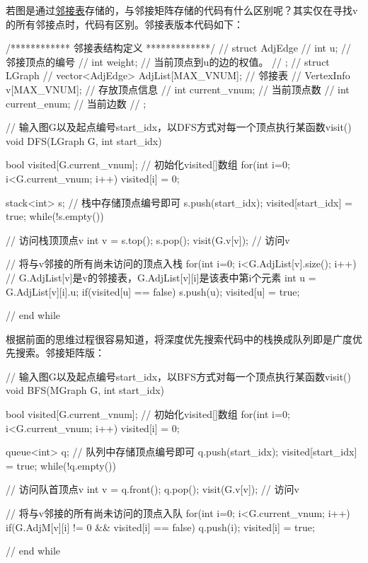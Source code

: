 若图是通过\uline{邻接表}存储的，与邻接矩阵存储的代码有什么区别呢？其实仅在寻找v的所有邻接点时，代码有区别。邻接表版本代码如下：
\begin{cppcodeHighlight}[14,31-37]
/************ 邻接表结构定义 *************/
// struct AdjEdge {
//     int u;  // 邻接顶点的编号
//     int weight; // 当前顶点到u的边的权值。
// };
// struct LGraph {
//     vector<AdjEdge> AdjList[MAX_VNUM];  // 邻接表
//     VertexInfo v[MAX_VNUM];     // 存放顶点信息
//     int current_vnum;           // 当前顶点数
//     int current_enum;           // 当前边数
// };

// 输入图G以及起点编号start_idx，以DFS方式对每一个顶点执行某函数visit()
    void DFS(LGraph G, int start_idx) {
        bool visited[G.current_vnum];
        // 初始化visited[]数组
        for(int i=0; i<G.current_vnum; i++) {
            visited[i] = 0;
        }

        stack<int> s;   // 栈中存储顶点编号即可
        s.push(start_idx);
        visited[start_idx] = true;
        while(!s.empty()) {
            // 访问栈顶顶点v
            int v = s.top();
            s.pop();
            visit(G.v[v]);   // 访问v
            
            // 将与v邻接的所有尚未访问的顶点入栈
            for(int i=0; i<G.AdjList[v].size(); i++) {
                // G.AdjList[v]是v的邻接表，G.AdjList[v][i]是该表中第i个元素
                int u = G.AdjList[v][i].u;
                if(visited[u] == false) {
                    s.push(u);
                    visited[u] = true;
                }
            }
        } // end while
    
    }
\end{cppcodeHighlight}

根据前面的思维过程很容易知道，将深度优先搜索代码中的栈换成队列即是广度优先搜索。邻接矩阵版：

\begin{cppcodeHighlight}[9-10,12-15,21]
// 输入图G以及起点编号start_idx，以BFS方式对每一个顶点执行某函数visit()
    void BFS(MGraph G, int start_idx) {
        bool visited[G.current_vnum];
        // 初始化visited[]数组
        for(int i=0; i<G.current_vnum; i++) {
            visited[i] = 0;
        }

        queue<int> q;   // 队列中存储顶点编号即可
        q.push(start_idx);
        visited[start_idx] = true;
        while(!q.empty()) {
            // 访问队首顶点v
            int v = q.front();
            q.pop();
            visit(G.v[v]);   // 访问v
            
            // 将与v邻接的所有尚未访问的顶点入队
            for(int i=0; i<G.current_vnum; i++) {
                if(G.AdjM[v][i] != 0 && visited[i] == false) {
                    q.push(i);
                    visited[i] = true;
                }
            }
        } // end while
    }
\end{cppcodeHighlight}

